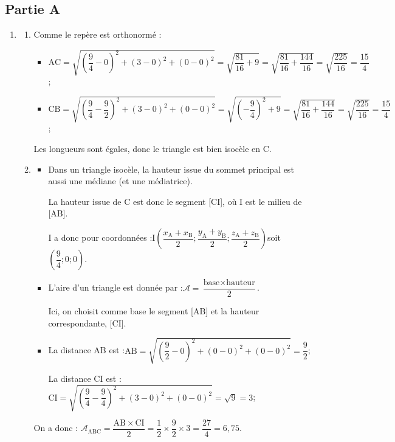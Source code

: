 \subsection*{Partie A}
\begin{enumerate}
\item 
	\begin{enumerate}
			\item 
			
			
			Comme le repère est orthonormé :
			\begin{itemize}
				\item $\mathrm{AC} = \sqrt{\left(\dfrac{9}{4}-0\right)^2 + (3-0)^2 + (0 - 0)^2} =\sqrt{\dfrac{81}{16}+ 9} =\sqrt{ \dfrac{81}{16} + \dfrac{144 }{16}} = \sqrt{\dfrac{225}{16}}=\dfrac{15}{4} $;
				\item $\mathrm{CB} = \sqrt{\left(\dfrac{9}{4}-\dfrac{9}{2}\right)^2 + (3-0)^2 + (0 - 0)^2} =\sqrt{\left(-\dfrac{9}{4}\right)^2+ 9} =\sqrt{ \dfrac{81}{16} + \dfrac{144 }{16}} = \sqrt{\dfrac{225}{16}}=\dfrac{15}{4} $;
			\end{itemize}
			
			Les longueurs sont égales, donc le triangle est bien isocèle en C.
			
			\item  \begin{itemize}
				\item  Dans un triangle isocèle, la hauteur issue du sommet principal est aussi une médiane (et une médiatrice).
			
			La hauteur issue de C est donc le segment [CI], où I est le milieu de [AB].
			
			I a donc pour coordonnées :\quad I$\left(\dfrac{x_{\mathrm{A}} + x_{\mathrm{B}}}{2} ; \dfrac{y_{\mathrm{A}} + y_{\mathrm{B}}}{2} ; \dfrac{z_{\mathrm{A}} + z_{\mathrm{B}}}{2}\right) $\quad soit \quad $\left(\dfrac{9}{4} ; 0 ; 0\right)$.
			
			\item L'aire d'un triangle est donnée par :\quad $\mathcal{A} = \dfrac{\text{base} \times \text{hauteur}
			}{2}$.
			
			Ici, on choisit comme base le segment [AB] et la hauteur correspondante, [CI].
			
			\item La distance AB est :\quad $\mathrm{AB} = \sqrt{\left(\dfrac{9}{2}-0\right)^2 + (0-0)^2 + (0 - 0)^2} =\dfrac{9}{2} $;
			
			La distance CI est :\quad $\mathrm{CI} = \sqrt{\left(\dfrac{9}{4}-\dfrac{9}{4}\right)^2 + (3-0)^2 + (0 - 0)^2} =\sqrt{ 9} =3$;
			\end{itemize}
			On a donc : \quad $\mathcal{A}_{\mathrm{ABC}} = \dfrac{\mathrm{AB} \times \mathrm{CI}}{2} = \dfrac{1}{2}  \times \dfrac{9}{2} \times 3 = \dfrac{27}{4} = 6,75$.
			

\end{enumerate}
\end{enumerate}
